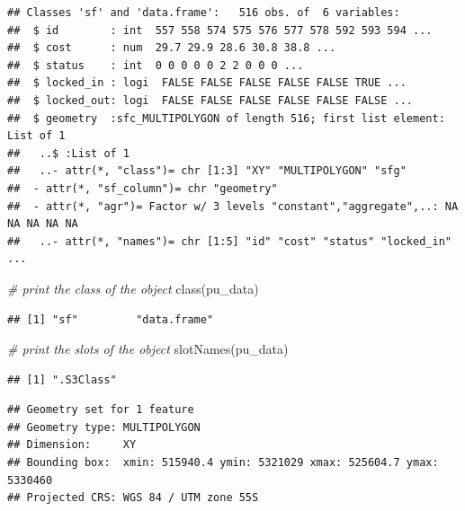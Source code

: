 \documentclass[
  12pt,
]{book}
\newenvironment{Shaded}{\begin{snugshade}}{\end{snugshade}}
\newcommand{\CommentTok}[1]{\textcolor[rgb]{0.56,0.35,0.01}{\textit{#1}}}
\newcommand{\DecValTok}[1]{\textcolor[rgb]{0.00,0.00,0.81}{#1}}
\newcommand{\FunctionTok}[1]{\textcolor[rgb]{0.00,0.00,0.00}{#1}}
\newcommand{\NormalTok}[1]{#1}
\newcommand{\SpecialCharTok}[1]{\textcolor[rgb]{0.00,0.00,0.00}{#1}}
\begin{document}
\begin{verbatim}
## Classes 'sf' and 'data.frame':   516 obs. of  6 variables:
##  $ id        : int  557 558 574 575 576 577 578 592 593 594 ...
##  $ cost      : num  29.7 29.9 28.6 30.8 38.8 ...
##  $ status    : int  0 0 0 0 0 2 2 0 0 0 ...
##  $ locked_in : logi  FALSE FALSE FALSE FALSE FALSE TRUE ...
##  $ locked_out: logi  FALSE FALSE FALSE FALSE FALSE FALSE ...
##  $ geometry  :sfc_MULTIPOLYGON of length 516; first list element: List of 1
##   ..$ :List of 1
##   ..- attr(*, "class")= chr [1:3] "XY" "MULTIPOLYGON" "sfg"
##  - attr(*, "sf_column")= chr "geometry"
##  - attr(*, "agr")= Factor w/ 3 levels "constant","aggregate",..: NA NA NA NA NA
##   ..- attr(*, "names")= chr [1:5] "id" "cost" "status" "locked_in" ...
\end{verbatim}

\begin{Shaded}
\begin{Highlighting}[]
\CommentTok{\# print the class of the object}
\FunctionTok{class}\NormalTok{(pu\_data)}
\end{Highlighting}
\end{Shaded}

\begin{verbatim}
## [1] "sf"         "data.frame"
\end{verbatim}

\begin{Shaded}
\begin{Highlighting}[]
\CommentTok{\# print the slots of the object}
\FunctionTok{slotNames}\NormalTok{(pu\_data)}
\end{Highlighting}
\end{Shaded}

\begin{verbatim}
## [1] ".S3Class"
\end{verbatim}

\begin{Shaded}
\end{Shaded}

\begin{verbatim}
## Geometry set for 1 feature 
## Geometry type: MULTIPOLYGON
## Dimension:     XY
## Bounding box:  xmin: 515940.4 ymin: 5321029 xmax: 525604.7 ymax: 5330460
## Projected CRS: WGS 84 / UTM zone 55S
\end{verbatim}
\end{document}
